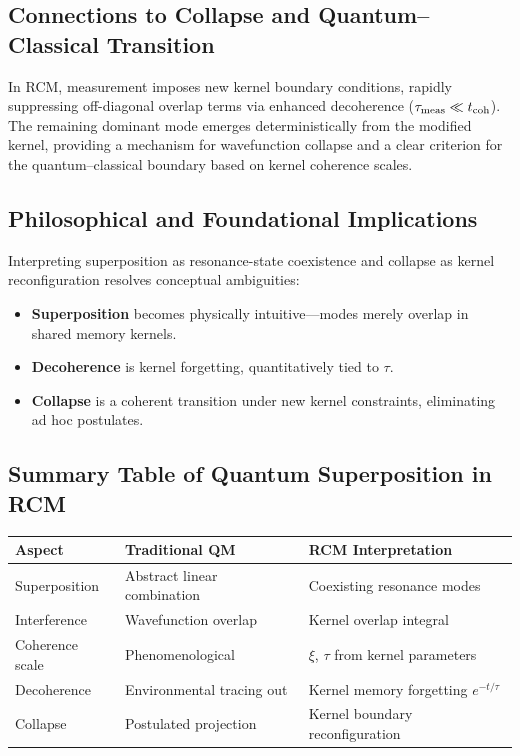 \subsection{Connections to Collapse and Quantum–Classical Transition}

In RCM, measurement imposes new kernel boundary conditions, rapidly suppressing off-diagonal overlap terms via enhanced decoherence (\(\tau_{\rm meas}\ll t_{\rm coh}\)).  The remaining dominant mode emerges deterministically from the modified kernel, providing a mechanism for wavefunction collapse and a clear criterion for the quantum–classical boundary based on kernel coherence scales.

\subsection{Philosophical and Foundational Implications}

Interpreting superposition as resonance-state coexistence and collapse as kernel reconfiguration resolves conceptual ambiguities:

\begin{itemize}
  \item \textbf{Superposition} becomes physically intuitive—modes merely overlap in shared memory kernels.  
  \item \textbf{Decoherence} is kernel forgetting, quantitatively tied to \(\tau\).  
  \item \textbf{Collapse} is a coherent transition under new kernel constraints, eliminating ad hoc postulates.
\end{itemize}

\subsection{Summary Table of Quantum Superposition in RCM}

\begin{center}
\begin{tabular}{|l|l|l|}
\hline
Aspect                   & Traditional QM                   & RCM Interpretation                      \\ \hline
Superposition            & Abstract linear combination      & Coexisting resonance modes              \\ \hline
Interference             & Wavefunction overlap             & Kernel overlap integral                 \\ \hline
Coherence scale          & Phenomenological                 & \(\xi\), \(\tau\) from kernel parameters \\ \hline
Decoherence              & Environmental tracing out        & Kernel memory forgetting \(e^{-t/\tau}\)\\ \hline
Collapse                 & Postulated projection            & Kernel boundary reconfiguration         \\ \hline
\end{tabular}
\end{center}

